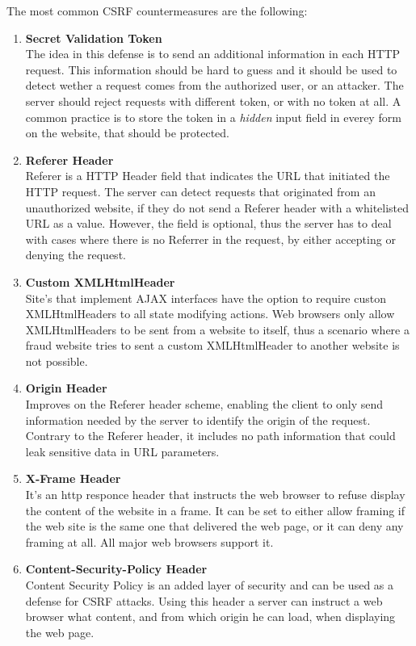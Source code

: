 The most common CSRF countermeasures are the following:
\begin{enumerate}
	\item \textbf{Secret Validation Token} \\
The idea in this defense is to send an additional information in each HTTP request. This information should be hard
to guess and it should be used to detect wether a request comes from the authorized user, or an attacker.  The server
should reject requests with different token, or with no token at all.  A common practice is to store the token in a 
\emph{hidden} input field in everey form on the website, that should be protected.
	\item \textbf{Referer Header} \\
Referer is a HTTP Header field that indicates the URL that initiated the HTTP request. The server can detect requests
that originated from an unauthorized website, if they do not send a Referer header with a whitelisted URL as a value. 
However, the field is optional, thus the server has to deal with cases where there is no Referrer in the request, 
by either accepting or denying the request.
	\item \textbf{Custom  XMLHtmlHeader} \\
	Site's that implement AJAX interfaces have the option to require custon XMLHtmlHeaders to all state modifying actions.
Web browsers only allow XMLHtmlHeaders to be sent from a website to itself, thus a scenario where a fraud website tries
to sent a custom XMLHtmlHeader to another website is not possible.
	\item \textbf{Origin Header} \\
	Improves on the Referer header scheme, enabling the client to only send information needed by the server to
	identify the origin of the request. Contrary to the Referer header, it includes no path information that could 
	leak sensitive data in URL parameters.
	\item \textbf{X-Frame Header} \\
	It's an http responce header that instructs the web browser to refuse display the content of 
	the website in a frame.  It can be set to either allow framing if the web site is the same one that delivered 
	the web page, or it can deny any framing at all.  All major web browsers support it.
	\item \textbf{Content-Security-Policy Header} \\
	Content Security Policy is an added layer of security and can be used as a defense for CSRF attacks.  Using 
	this header a server can instruct a web browser what content, and from which origin he can load, when displaying
	the web page.
\end{enumerate}
\begin{comment}
Access-Control-Allow-Origin 
Many websites today need to access resources on different domain than theirs.  In this scenario the web browser
is forced to make a request to the server hosting the resource.  The server may pose a restriction on the 
domains that can access his content, by requiring the web browser to include an Origin header to check on the
domain demanding the resource.
\end{comment}


